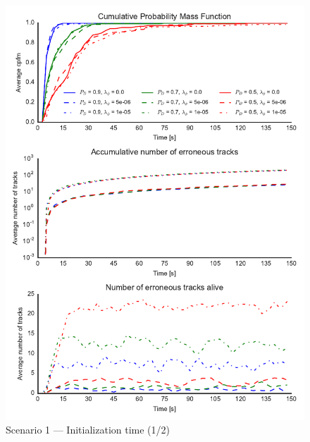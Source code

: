 \begin{figure}
\centering
\includegraphics{Figures/plots/Scenario1_Init-Time(1-2).pdf}
\caption{Scenario 1 --- Initialization time (1/2)}\label{fig:init1_time_1-2}
\end{figure}

